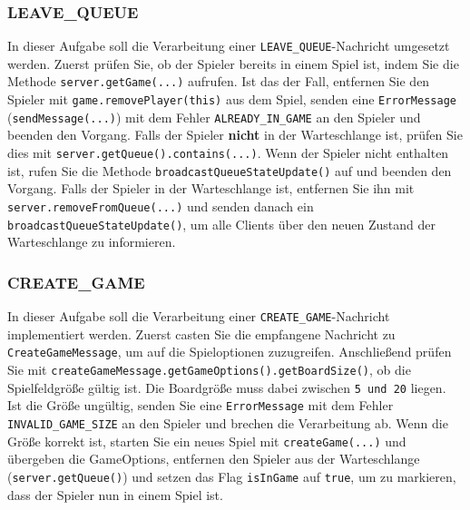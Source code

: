 \documentclass[12pt]{article}
\begin{document}
\subsubsection*{LEAVE\_QUEUE}

In dieser Aufgabe soll die Verarbeitung einer \texttt{LEAVE\_QUEUE}-Nachricht umgesetzt werden. 
Zuerst prüfen Sie, ob der Spieler bereits in einem Spiel ist, indem Sie die Methode \texttt{server\hspace{0pt}.getGame(...)} aufrufen. 
Ist das der Fall, entfernen Sie den Spieler mit \texttt{game.removePlayer(this)} aus dem Spiel, 
senden eine \texttt{ErrorMessage} \hspace{0pt}(\texttt{sendMessage(...)}) mit dem Fehler \texttt{ALREADY\_IN\_GAME} an den Spieler und beenden den Vorgang. 
Falls der Spieler \textbf{nicht} in der Warteschlange ist, prüfen Sie dies mit \texttt{server.\hspace{0pt}getQueue()\hspace{0pt}.contains(...)}. 
Wenn der Spieler nicht enthalten ist, rufen Sie die Methode \texttt{broadcastQueue\hspace{0pt}StateUpdate()} auf und beenden den Vorgang. 
Falls der Spieler in der Warteschlange ist, entfernen Sie ihn mit \texttt{server.removeFromQueue(...)} und senden danach ein \texttt{broadcastQueueStateUpdate()}, 
um alle Clients über den neuen Zustand der Warteschlange zu informieren.

\subsubsection*{CREATE\_GAME}

In dieser Aufgabe soll die Verarbeitung einer \texttt{CREATE\_GAME}-Nachricht implementiert werden. 
Zuerst casten Sie die empfangene Nachricht zu \texttt{CreateGameMessage}, um auf die Spieloptionen zuzugreifen. 
Anschließend prüfen Sie mit \texttt{createGameMessage.\hspace{0pt}getGameOptions()\hspace{0pt}.getBoardSize()}, 
ob die Spielfeldgröße gültig ist. Die Boardgröße muss dabei zwischen \texttt{5 und 20} liegen. 
Ist die Größe ungültig, senden Sie eine \texttt{ErrorMessage} mit dem Fehler \texttt{INVALID\_GAME\_SIZE} an den Spieler 
und brechen die Verarbeitung ab. 
Wenn die Größe korrekt ist, starten Sie ein neues Spiel mit \texttt{createGame(...)} und übergeben die GameOptions, 
entfernen den Spieler aus der Warteschlange (\texttt{server.getQueue()}) und setzen das Flag \texttt{isInGame} auf \texttt{true}, 
um zu markieren, dass der Spieler nun in einem Spiel ist.
\end{document}
